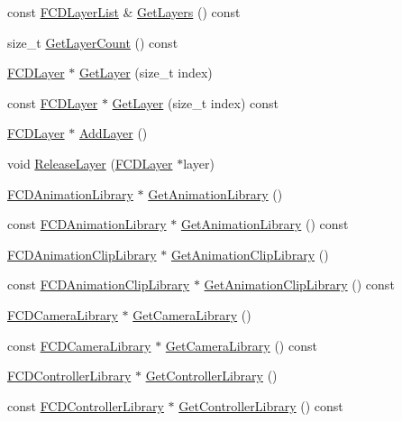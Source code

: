 \begin{DoxyCompactItemize}
const \hyperlink{classfm_1_1pvector}{FCDLayerList} \& \hyperlink{classFCDocument_a08b89768c49a07cdd9319bcc44c9747c}{GetLayers} () const 
\item 
size\_\-t \hyperlink{classFCDocument_a40b60296aad9c67c00e66ff739cea4e3}{GetLayerCount} () const 
\item 
\hyperlink{classFCDLayer}{FCDLayer} $\ast$ \hyperlink{classFCDocument_a7cee58d4d66a79a5dc37cc3853f214e6}{GetLayer} (size\_\-t index)
\item 
const \hyperlink{classFCDLayer}{FCDLayer} $\ast$ \hyperlink{classFCDocument_a89cccee9d092a5b2b2cf61f56b7d132d}{GetLayer} (size\_\-t index) const 
\item 
\hyperlink{classFCDLayer}{FCDLayer} $\ast$ \hyperlink{classFCDocument_aa09334becd078b5efce7d68f6850f446}{AddLayer} ()
\item 
void \hyperlink{classFCDocument_aa21a4ba5101a6e78ccb87fc978a2e9b7}{ReleaseLayer} (\hyperlink{classFCDLayer}{FCDLayer} $\ast$layer)
\item 
\hyperlink{classFCDLibrary}{FCDAnimationLibrary} $\ast$ \hyperlink{classFCDocument_ac5b574a9a005b903cfc9e65ca73c5b4d}{GetAnimationLibrary} ()
\item 
const \hyperlink{classFCDLibrary}{FCDAnimationLibrary} $\ast$ \hyperlink{classFCDocument_a83d9efbb207fb3c5269f20f7254649ec}{GetAnimationLibrary} () const 
\item 
\hyperlink{classFCDLibrary}{FCDAnimationClipLibrary} $\ast$ \hyperlink{classFCDocument_aeaf85fb50ac173806e3835ba41175bed}{GetAnimationClipLibrary} ()
\item 
const \hyperlink{classFCDLibrary}{FCDAnimationClipLibrary} $\ast$ \hyperlink{classFCDocument_a3af1d6254bd19b8f8d607a3d478280f3}{GetAnimationClipLibrary} () const 
\item 
\hyperlink{classFCDLibrary}{FCDCameraLibrary} $\ast$ \hyperlink{classFCDocument_aaf837a4a0cb4939ad3611ed512a96846}{GetCameraLibrary} ()
\item 
const \hyperlink{classFCDLibrary}{FCDCameraLibrary} $\ast$ \hyperlink{classFCDocument_acabdb9a190f74c63457a5d80b46249ec}{GetCameraLibrary} () const 
\item 
\hyperlink{classFCDLibrary}{FCDControllerLibrary} $\ast$ \hyperlink{classFCDocument_a7bb386de2a06c190a05c34342f6cc52d}{GetControllerLibrary} ()
\item 
const \hyperlink{classFCDLibrary}{FCDControllerLibrary} $\ast$ \hyperlink{classFCDocument_adf1437beef61dff46a556b7ee92b4cd6}{GetControllerLibrary} () const 
\item 

\end{DoxyCompactItemize}
